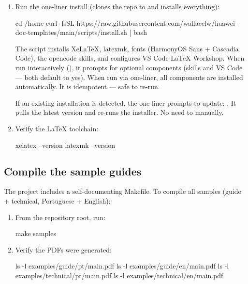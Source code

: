\documentclass{guide}
\begin{document}
\stepbystep
\begin{enumerate}
  \item Run the one-liner install (clones the repo to
         and installs everything):

  \begin{code}[bash]
cd /home
curl -fsSL https://raw.githubusercontent.com/wallacelw/huawei-doc-templates/main/scripts/install.sh | bash
  \end{code}

  \begin{infobox}
  The script installs XeLaTeX, latexmk, fonts (HarmonyOS Sans + Cascadia Code),
  the opencode skills, and configures VS Code LaTeX Workshop. When run
  interactively (), it prompts for optional components
  (skills and VS Code --- both default to yes). When run via one-liner, all
  components are installed automatically. It is idempotent --- safe to re-run.
  \end{infobox}

  \begin{infobox}
  If an existing installation is detected, the one-liner prompts to update:
  . It pulls the latest version and
  re-runs the installer. No need to  manually.
  \end{infobox}

  \item Verify the LaTeX toolchain:

  \begin{code}[bash]
xelatex --version
latexmk --version
  \end{code}
\end{enumerate}

\subsection{Compile the sample guides}

The project includes a self-documenting Makefile. To compile all samples
(guide + technical, Portuguese + English):

\stepbystep
\begin{enumerate}
  \item From the repository root, run:

  \begin{code}[bash]
make samples
  \end{code}

  \item Verify the PDFs were generated:

  \begin{code}[bash]
ls -l examples/guide/pt/main.pdf
ls -l examples/guide/en/main.pdf
ls -l examples/technical/pt/main.pdf
ls -l examples/technical/en/main.pdf
  \end{code}
\end{enumerate}
\end{document}
